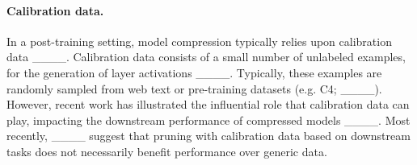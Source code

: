 \paragraph{Calibration data.}

In a post-training setting, model compression typically relies upon calibration data ____. Calibration data consists of a small number of unlabeled examples, for the generation of layer activations ____. Typically, these examples are randomly sampled from web text or pre-training datasets (e.g. C4; ____). However, recent work has illustrated the influential role that calibration data can play, impacting the downstream performance of compressed models ____. Most recently, ____ suggest that pruning with calibration data based on downstream tasks does not necessarily benefit performance over generic data.